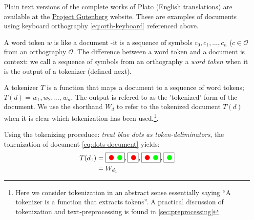 \begin{example}\label{ex:doc-plato}
    Plain text versions of the complete works of Plato (English translations) are available at the \href{https://www.gutenberg.org/ebooks/author/93}{Project Gutenberg} website. These are examples of documents using keyboard orthography \ref{eq:orth-keyboard} referenced above.
\end{example}

\begin{definition}
  A word token $w$ is like a document -it is a sequence of symbols $c_0,c_1,\dots,c_n$ ($c\in\mathscr{O}$ from an orthography $\mathscr{O}$. The difference between a word token and a document is context: we call a sequence of symbols from an orthography a \emph{word token} when it is the output of a tokenizer (defined next).
\end{definition}

\begin{definition}[Tokenizer]
   A tokenizer $T$ is a function that maps a document to a sequence of word tokens; $T(d)=w_1,w_2,\dots,w_n$. The output is refered to as the 'tokenized' form of the document. We use the shorthand $W_d$ to refer to the tokenized document $T(d)$ when it is clear which tokenization has been used.\footnote{Here we consider tokenization in an abstract sense essentially saying ``A tokenizer is a function that extracts tokens''. A practical discussion of tokenization and text-preprocessing is found in \autoref{sec:preprocessing}}.
\end{definition}

\begin{example}\label{ex:doc-plato}
  Using the tokenizing proceduce: \emph{treat blue dots as token-deliminators}, the tokenization of document \eqref{eq:dots-document} yields:
  \begin{align}
    T(d_1)&=\fbox{\mycirc[red] \mycirc[green]}, \fbox{\mycirc[red]}, \fbox{\mycirc[red] \mycirc[green]}, \fbox{\mycirc[green]}\label{eq:dots-tokens}\\
    &=W_{d_1}\nonumber
  \end{align}
\end{example}

